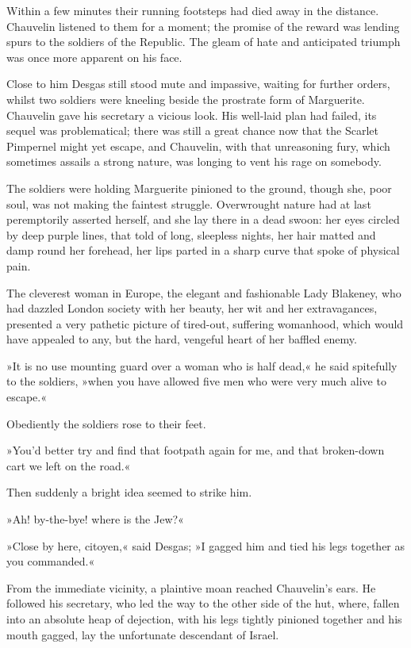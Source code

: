 Within a few minutes their running footsteps had died away in the distance. Chauvelin listened to them for a moment; the promise of the reward was lending spurs to the soldiers of the Republic. The gleam of hate and anticipated triumph was once more apparent on his face.

Close to him Desgas still stood mute and impassive, waiting for further orders, whilst two soldiers were kneeling beside the prostrate form of Marguerite. Chauvelin gave his secretary a vicious look. His well-laid plan had failed, its sequel was problematical; there was still a great chance now that the Scarlet Pimpernel might yet escape, and Chauvelin, with that unreasoning fury, which sometimes assails a strong nature, was longing to vent his rage on somebody.

The soldiers were holding Marguerite pinioned to the ground, though she, poor soul, was not making the faintest struggle. Overwrought nature had at last peremptorily asserted herself, and she lay there in a dead swoon: her eyes circled by deep purple lines, that told of long, sleepless nights, her hair matted and damp round her forehead, her lips parted in a sharp curve that spoke of physical pain.

The cleverest woman in Europe, the elegant and fashionable Lady Blakeney, who had dazzled London society with her beauty, her wit and her extravagances, presented a very pathetic picture of tired-out, suffering womanhood, which would have appealed to any, but the hard, vengeful heart of her baffled enemy.

»It is no use mounting guard over a woman who is half dead,« he said spitefully to the soldiers, »when you have allowed five men who were very much alive to escape.«

Obediently the soldiers rose to their feet.

»You'd better try and find that footpath again for me, and that broken-down cart we left on the road.«

Then suddenly a bright idea seemed to strike him.

»Ah! by-the-bye! where is the Jew?«

»Close by here, citoyen,« said Desgas; »I gagged him and tied his legs together as you commanded.«

From the immediate vicinity, a plaintive moan reached Chauve\-lin's ears. He followed his secretary, who led the way to the other side of the hut, where, fallen into an absolute heap of dejection, with his legs tightly pinioned together and his mouth gagged, lay the unfortunate descendant of Israel.

